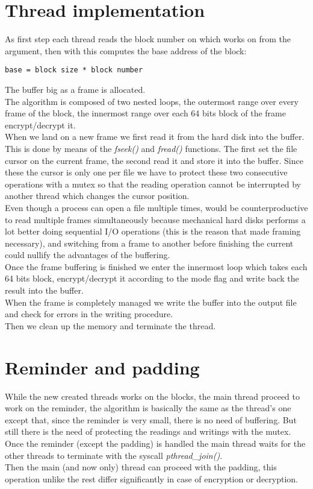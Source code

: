 \section{Thread implementation}
As first step each thread reads the block number on which works on from the argument, then with this computes the base address of the block:

\begin{scripting}
\begin{verbatim}
base = block size * block number
\end{verbatim}
\end{scripting}

The buffer big as a frame is allocated.\\
The algorithm is composed of two nested loops, the outermost range over every frame of the block, the innermost range over each 64 bits block of the frame encrypt/decrypt it.\\
When we land on a new frame we first read it from the hard disk into the buffer. This is done  by means of the \emph{fseek()} and \emph{fread()} functions. The first set the file cursor on the current frame, the second read it and store it into the buffer. Since these the cursor is only one per file we have to protect these two consecutive operations with a mutex so that the reading operation cannot be interrupted by another thread which changes the cursor position.\\
Even though a process can open a file multiple times, would be counterproductive to read multiple frames simultaneously because mechanical hard disks performs a lot better doing sequential I/O operations (this is the reason that made framing necessary), and switching from a frame to another before finishing the current could nullify the advantages of the buffering.\\
Once the frame buffering is finished we enter the innermost loop which takes each 64 bits block, encrypt/decrypt it according to the mode flag and write back the result into the buffer.\\
When the frame is completely managed we write the buffer into the output file and check for errors in the writing procedure.\\
Then we clean up the memory and terminate the thread.

\section{Reminder and padding}
While the new created threads works on the blocks, the main thread proceed to work on the reminder, the algorithm is basically the same as the thread's one except that, since the reminder is very small, there is no need of buffering. But still there is the need of protecting the readings and writings with the mutex.\\
Once the reminder (except the padding) is handled the main thread waits for the other threads to terminate with the syscall \emph{pthread\_join()}.\\
Then the main (and now only) thread can proceed with the padding, this operation unlike the rest differ significantly in case of encryption or decryption.

